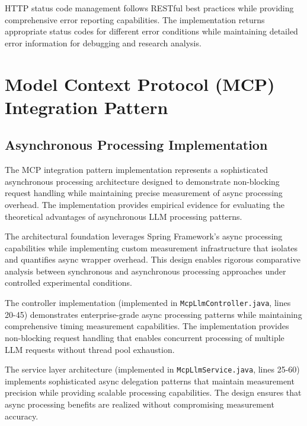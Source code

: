 
HTTP status code management follows RESTful best practices while providing comprehensive error reporting capabilities. The implementation returns appropriate status codes for different error conditions while maintaining detailed error information for debugging and research analysis.


\section{Model Context Protocol (MCP) Integration Pattern}

\subsection{Asynchronous Processing Implementation}

The MCP integration pattern implementation represents a sophisticated asynchronous processing architecture designed to demonstrate non-blocking request handling while maintaining precise measurement of async processing overhead. The implementation provides empirical evidence for evaluating the theoretical advantages of asynchronous LLM processing patterns.

The architectural foundation leverages Spring Framework's async processing capabilities while implementing custom measurement infrastructure that isolates and quantifies async wrapper overhead. This design enables rigorous comparative analysis between synchronous and asynchronous processing approaches under controlled experimental conditions.

The controller implementation (implemented in \texttt{McpLlmController.java}, lines 20-45) demonstrates enterprise-grade async processing patterns while maintaining comprehensive timing measurement capabilities. The implementation provides non-blocking request handling that enables concurrent processing of multiple LLM requests without thread pool exhaustion.


The service layer architecture (implemented in \texttt{McpLlmService.java}, lines 25-60) implements sophisticated async delegation patterns that maintain measurement precision while providing scalable processing capabilities. The design ensures that async processing benefits are realized without compromising measurement accuracy.

